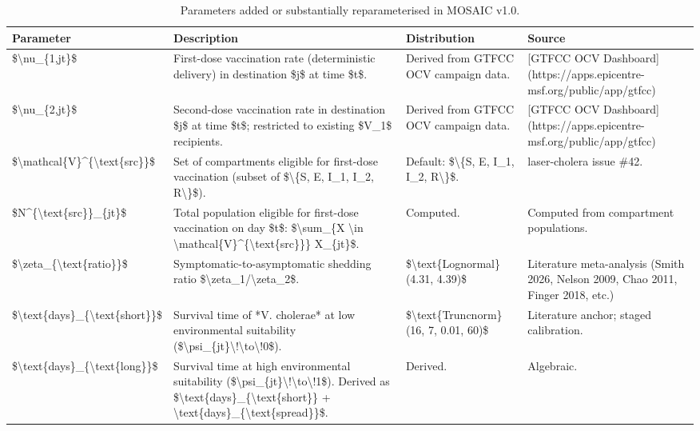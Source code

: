 \documentclass[
]{book}
\begin{document}
\begin{table}

\caption{\label{tab:params}Parameters added or substantially reparameterised in MOSAIC v1.0.}
\centering
\begin{tabular}[t]{l|l|l|l}
\hline
Parameter & Description & Distribution & Source\\
\hline
\$\textbackslash{}nu\_\{1,jt\}\$ & First-dose vaccination rate (deterministic delivery) in destination \$j\$ at time \$t\$. & Derived from GTFCC OCV campaign data. & [GTFCC OCV Dashboard](https://apps.epicentre-msf.org/public/app/gtfcc)\\
\hline
\$\textbackslash{}nu\_\{2,jt\}\$ & Second-dose vaccination rate in destination \$j\$ at time \$t\$; restricted to existing \$V\_1\$ recipients. & Derived from GTFCC OCV campaign data. & [GTFCC OCV Dashboard](https://apps.epicentre-msf.org/public/app/gtfcc)\\
\hline
\$\textbackslash{}mathcal\{V\}\textasciicircum{}\{\textbackslash{}text\{src\}\}\$ & Set of compartments eligible for first-dose vaccination (subset of \$\textbackslash{}\{S, E, I\_1, I\_2, R\textbackslash{}\}\$). & Default: \$\textbackslash{}\{S, E, I\_1, I\_2, R\textbackslash{}\}\$. & laser-cholera issue \#42.\\
\hline
\$N\textasciicircum{}\{\textbackslash{}text\{src\}\}\_\{jt\}\$ & Total population eligible for first-dose vaccination on day \$t\$: \$\textbackslash{}sum\_\{X \textbackslash{}in \textbackslash{}mathcal\{V\}\textasciicircum{}\{\textbackslash{}text\{src\}\}\} X\_\{jt\}\$. & Computed. & Computed from compartment populations.\\
\hline
\$\textbackslash{}zeta\_\{\textbackslash{}text\{ratio\}\}\$ & Symptomatic-to-asymptomatic shedding ratio \$\textbackslash{}zeta\_1/\textbackslash{}zeta\_2\$. & \$\textbackslash{}text\{Lognormal\}(4.31, 4.39)\$ & Literature meta-analysis (Smith 2026, Nelson 2009, Chao 2011, Finger 2018, etc.)\\
\hline
\$\textbackslash{}text\{days\}\_\{\textbackslash{}text\{short\}\}\$ & Survival time of *V. cholerae* at low environmental suitability (\$\textbackslash{}psi\_\{jt\}\textbackslash{}!\textbackslash{}to\textbackslash{}!0\$). & \$\textbackslash{}text\{Truncnorm\}(16, 7, 0.01, 60)\$ & Literature anchor; staged calibration.\\
\hline
\$\textbackslash{}text\{days\}\_\{\textbackslash{}text\{long\}\}\$ & Survival time at high environmental suitability (\$\textbackslash{}psi\_\{jt\}\textbackslash{}!\textbackslash{}to\textbackslash{}!1\$). Derived as \$\textbackslash{}text\{days\}\_\{\textbackslash{}text\{short\}\} + \textbackslash{}text\{days\}\_\{\textbackslash{}text\{spread\}\}\$. & Derived. & Algebraic.\\

\end{tabular}
\end{table}
\end{document}
